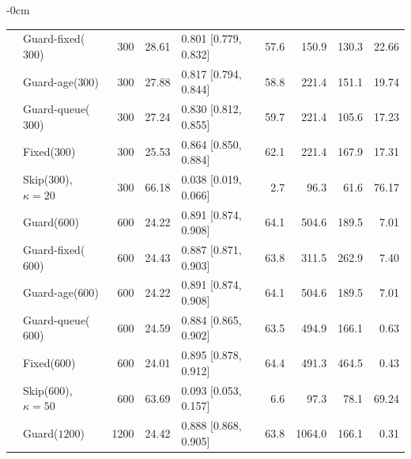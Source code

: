 \documentclass[mathematics,supfile,submit,moreauthors]{Definitions/mdpi}
\newcommand{\sealednum}[1]{#1}
\begin{document}
\begin{table}[htbp]
\begin{adjustwidth}{-\extralength}{0cm}
\begin{tabular}{llrrlrrrr}
 & Guard-fixed($\sealednum{300}$) & \sealednum{300} & \sealednum{28.61} & \sealednum{0.801 [0.779, 0.832]} & \sealednum{57.6} & \sealednum{150.9} & \sealednum{130.3} & \sealednum{22.66} \\
 & Guard-age($\sealednum{300}$)  & \sealednum{300} & \sealednum{27.88} & \sealednum{0.817 [0.794, 0.844]} & \sealednum{58.8} & \sealednum{221.4} & \sealednum{151.1} & \sealednum{19.74} \\
 & Guard-queue($\sealednum{300}$) & \sealednum{300} & \sealednum{27.24} & \sealednum{0.830 [0.812, 0.855]} & \sealednum{59.7} & \sealednum{221.4} & \sealednum{105.6} & \sealednum{17.23} \\
 & Fixed($\sealednum{300}$)      & \sealednum{300} & \sealednum{25.53} & \sealednum{0.864 [0.850, 0.884]} & \sealednum{62.1} & \sealednum{221.4} & \sealednum{167.9} & \sealednum{17.31} \\
 & Skip($\sealednum{300}$), $\kappa=20$ & \sealednum{300} & \sealednum{66.18} & \sealednum{0.038 [0.019, 0.066]} & \sealednum{2.7} & \sealednum{96.3} & \sealednum{61.6} & \sealednum{76.17} \\
 & Guard($\sealednum{600}$)      & \sealednum{600} & \sealednum{24.22} & \sealednum{0.891 [0.874, 0.908]} & \sealednum{64.1} & \sealednum{504.6} & \sealednum{189.5} & \sealednum{7.01} \\
 & Guard-fixed($\sealednum{600}$) & \sealednum{600} & \sealednum{24.43} & \sealednum{0.887 [0.871, 0.903]} & \sealednum{63.8} & \sealednum{311.5} & \sealednum{262.9} & \sealednum{7.40} \\
 & Guard-age($\sealednum{600}$)  & \sealednum{600} & \sealednum{24.22} & \sealednum{0.891 [0.874, 0.908]} & \sealednum{64.1} & \sealednum{504.6} & \sealednum{189.5} & \sealednum{7.01} \\
 & Guard-queue($\sealednum{600}$) & \sealednum{600} & \sealednum{24.59} & \sealednum{0.884 [0.865, 0.902]} & \sealednum{63.5} & \sealednum{494.9} & \sealednum{166.1} & \sealednum{0.63} \\
 & Fixed($\sealednum{600}$)      & \sealednum{600} & \sealednum{24.01} & \sealednum{0.895 [0.878, 0.912]} & \sealednum{64.4} & \sealednum{491.3} & \sealednum{464.5} & \sealednum{0.43} \\
 & Skip($\sealednum{600}$), $\kappa=50$ & \sealednum{600} & \sealednum{63.69} & \sealednum{0.093 [0.053, 0.157]} & \sealednum{6.6} & \sealednum{97.3} & \sealednum{78.1} & \sealednum{69.24} \\
 & Guard($\sealednum{1200}$)     & \sealednum{1200} & \sealednum{24.42} & \sealednum{0.888 [0.868, 0.905]} & \sealednum{63.8} & \sealednum{1064.0} & \sealednum{166.1} & \sealednum{0.31} \\

\end{tabular}
\end{adjustwidth}
\end{table}
\end{document}
